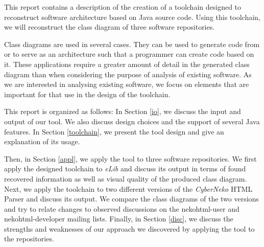 This report contains a description of the creation of a toolchain designed to reconstruct software architecture based on Java source code.
Using this toolchain, we will reconstruct the class diagram of three software repositories.

Class diagrams are used in several cases. 
They can be used to generate code from or to serve as an architecture such that a programmer can create code based on it.
These applications require a greater amount of detail in the generated class diagram than when considering the purpose of analysis of existing software.
As we are interested in analysing existing software, we focus on elements that are important for that use in the design of the toolchain.

This report is organized as follows:
In Section \ref{io}, we discuss the input and output of our tool. We also discuss design choices and the support of several Java features.
In Section \ref{toolchain}, we present the tool design and give an explanation of its usage. 

Then, in Section \ref{appl}, we apply the tool to three software repositories. We first apply the designed toolchain to \textit{eLib} and discuss its output in terms of found recovered information as well as visual quality of the produced class diagram. Next, we apply the toolchain to two different versions of the \textit{CyberNeko} HTML Parser and discuss its output. We compare the class diagrams of the two versions and try to relate changes to observed discussions on the nekohtml-user and nekohtml-developer mailing lists. Finally, in Section \ref{disc}, we discuss the strengths and weaknesses of our approach we discovered by applying the tool to the repositories.

